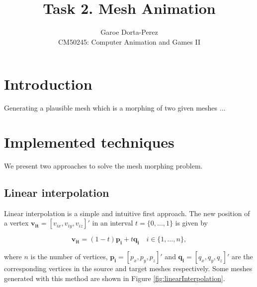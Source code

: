 \documentclass[12pt]{article}
\begin{document}
  
\title{Task 2. Mesh Animation}
\author{Garoe Dorta-Perez\\
CM50245: Computer Animation and Games II}
 
\maketitle
 
\section{Introduction}

Generating a plausible mesh which is a morphing of two given meshes ...

\section{Implemented techniques}

We present two approaches to solve the mesh morphing problem. 

\subsection{Linear interpolation}

Linear interpolation is a simple and intuitive first approach.
The new position of a vertex $\mathbf{v_{it}} = \left[ v_{ix}, v_{iy}, v_{iz}\right]' $ in an interval $t = \lbrace 0, \ldots, 1 \rbrace$ is given by

\begin{equation*}
\mathbf{v_{it}} = (1 - t) \mathbf{p_i} + t \mathbf{q_i} \quad i \in \lbrace 1, \ldots, n \rbrace,
\end{equation*}

where $n$ is the number of vertices, $\mathbf{p_i} = \left[ p_x, p_y, p_z\right]'$ and $\mathbf{q_i} = \left[ q_x, q_y, q_z\right]'$ are the corresponding vertices in the source and target meshes respectively.
Some meshes generated with this method are shown in Figure \ref{fig:linearInterpolation}.
\end{document}
